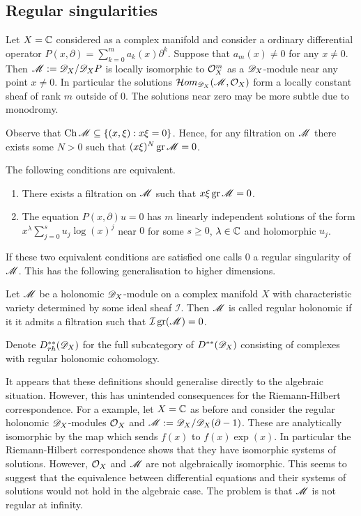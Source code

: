 \subsection{Regular singularities}
Let $X=\mathbb{C}$ considered as a complex manifold and consider a ordinary differential operator
$P(x,\partial) = \sum_{k=0}^m a_k(x)\partial^k.$
Suppose that $a_m(x)\neq 0$ for any $x\neq 0$.
Then $\mathscr{M} :=\mathscr{D}_X/\mathscr{D}_X P$ is locally isomorphic to $\mathcal{O}_X^m$ as a $\mathscr{D}_X$-module near any point $x\neq 0$.
In particular the solutions $\mathcal{H}om_{\mathscr{D}_X}(\mathscr{M},\mathcal{O}_X)$ form a locally constant sheaf of rank $m$ outside of $0$.
The solutions near zero may be more subtle due to monodromy.

Observe that $\operatorname{Ch} \mathscr{M}\subseteq \{(x,\xi): x\xi = 0\}$.
Hence, for any filtration on $\mathscr{M}$ there exists some $N>0$ such that
$(x\xi)^N \operatorname{gr}\mathscr{M} = 0 $.
\begin{proposition}{\cite[Section 5.1]{kashiwara2003d}}
  The following conditions are equivalent.
  \begin{enumerate}
    \item There exists a filtration on $\mathscr{M}$ such that $x\xi\operatorname{gr}\mathscr{M} = 0$.
    \item The equation $P(x,\partial)u=0$ has $m$ linearly independent solutions of the form $x^\lambda \sum_{j=0}^s u_j \log(x)^j $
    near $0$ for some $s\geq 0$, $\lambda \in \mathbb{C}$ and holomorphic $u_j$.
  \end{enumerate}
\end{proposition}
If these two equivalent conditions are satisfied one calls $0$ a regular singularity of $\mathscr{M}$.
This has the following generalisation to higher dimensions.
\begin{definition}
   Let $\mathscr{M}$ be a holonomic $\mathscr{D}_X$-module on a complex manifold $X$ with characteristic variety determined by some ideal sheaf $\mathcal{I}$. Then $\mathscr{M}$ is called regular holonomic if it it admits a filtration such that $\mathcal{I} \operatorname{gr}(\mathscr{M}) = 0$.
\end{definition}
Denote $D^{**}_{rh}(\mathscr{D}_X)$ for the full subcategory of $D^{**}(\mathscr{D}_X)$ consisting of complexes with regular holonomic cohomology.

It appears that these definitions should generalise directly to the algebraic situation.
However, this has unintended consequences for the Riemann-Hilbert correspondence.
For a example, let $X = \mathbb{C}$ as before and consider the regular holonomic $\mathscr{D}_X$-modules $\mathcal{O}_X$ and $\mathscr{M} := \mathscr{D}_X/\mathscr{D}_X(\partial - 1)$.
These are analytically isomorphic by the map which sends $f(x)$ to $f(x)\exp(x)$.
In particular the Riemann-Hilbert correspondence shows that they have isomorphic systems of solutions.
However, $\mathcal{O}_X$ and $\mathscr{M}$ are not algebraically isomorphic.
This seems to suggest that the equivalence between differential equations and their systems of solutions would not hold in the algebraic case.
The problem is that $\mathscr{M}$ is not regular at infinity.

